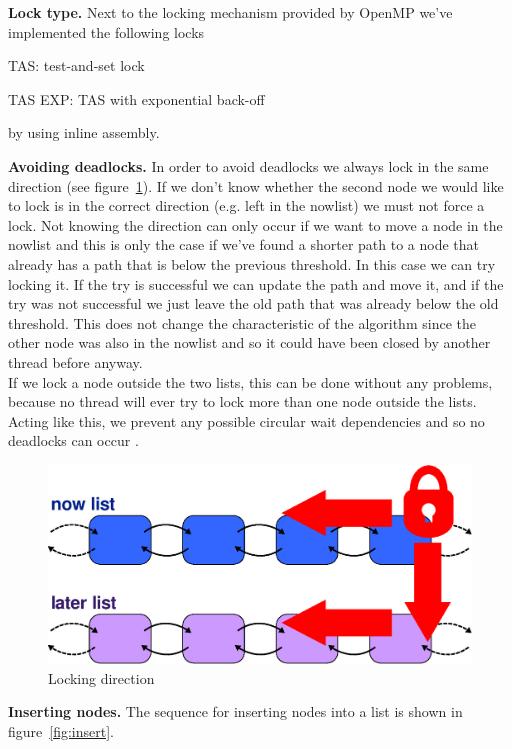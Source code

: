 \documentclass[letterpaper]{article}
\newcommand{\mypar}[1]{{\bf #1.}}
\begin{document}
\mypar{Lock type}
Next to the locking mechanism provided by OpenMP we've implemented the following locks
\begin{compactitem}
\item TAS: test-and-set lock
\item TAS EXP: TAS with exponential back-off
\end{compactitem}
by using inline assembly.

\mypar{Avoiding deadlocks}
In order to avoid deadlocks we always lock in the same direction (see figure~\ref{fig:lock}). If we don't know whether the second node we would like to lock is in the correct direction (e.g. left in the nowlist) we must not force a lock. Not knowing  the direction can only occur if we want to move a node in the nowlist and this is only the case if we've found a shorter path to a node that already has a path that is below the previous threshold. In this case we can try locking it. If the try is successful we can update the path and move it, and if the try was not successful we just leave the old path that was already below the old threshold. This does not change the characteristic of the algorithm since the other node was also in the nowlist and so it could have been closed by another thread before anyway. \\
If we lock a node outside the two lists, this can be done without any problems, because no thread will ever try to lock more than one node outside the lists.
Acting like this, we prevent any possible circular wait dependencies and so no deadlocks can occur \cite{Coffman:71}.

\begin{figure}[h]\centering
  \includegraphics[scale=0.38]{locking.eps}
  \caption{Locking direction \label{fig:lock}}
\end{figure}

\mypar{Inserting nodes}
The sequence for inserting nodes into a list is shown in figure~\ref{fig:insert}.
\end{document}
